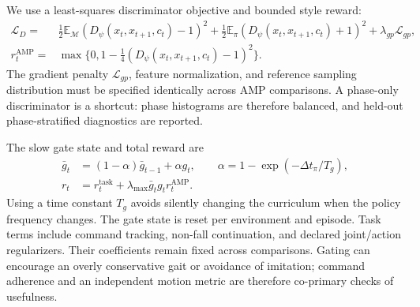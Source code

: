 \documentclass[11pt,a4paper]{article}
\begin{document}
We use a least-squares discriminator objective and bounded style reward:
\begin{align}
 \mathcal L_D={}&\tfrac12\mathbb E_{\mathcal M}(D_\psi(x_t,x_{t+1},c_t)-1)^2
 +\tfrac12\mathbb E_{\pi}(D_\psi(x_t,x_{t+1},c_t)+1)^2+\lambda_{gp}\mathcal L_{gp},\\
 r^{\mathrm{AMP}}_t={}&\max\{0,1-\tfrac14(D_\psi(x_t,x_{t+1},c_t)-1)^2\}.
\end{align}
The gradient penalty $\mathcal L_{gp}$, feature normalization, and reference sampling distribution must be specified identically across AMP comparisons. A phase-only discriminator is a shortcut: phase histograms are therefore balanced, and held-out phase-stratified diagnostics are reported.

The slow gate state and total reward are
\begin{align}
 \bar g_t&=(1-\alpha)\bar g_{t-1}+\alpha g_t,\qquad \alpha=1-\exp(-\Delta t_{\pi}/T_g),\\
 r_t&=r^{\mathrm{task}}_t+\lambda_{\max}\bar g_t g_t r^{\mathrm{AMP}}_t.
 \label{eq:reward}
\end{align}
Using a time constant $T_g$ avoids silently changing the curriculum when the policy frequency changes. The gate state is reset per environment and episode. Task terms include command tracking, non-fall continuation, and declared joint/action regularizers. Their coefficients remain fixed across comparisons. Gating can encourage an overly conservative gait or avoidance of imitation; command adherence and an independent motion metric are therefore co-primary checks of usefulness.
\end{document}
